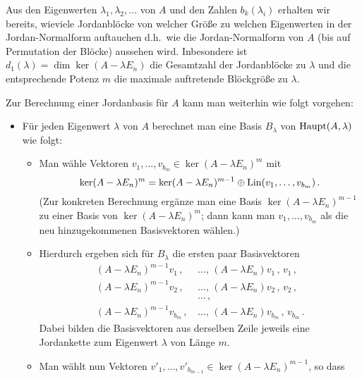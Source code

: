 \documentclass[a4paper,10pt,numbers = noenddot]{scrartcl}
\begin{document}
Aus den Eigenwerten $\lambda_1, \lambda_2, \dotsc$ von $A$ und den Zahlen $b_k(\lambda_i)$ erhalten wir bereits, wieviele Jordanblöcke von welcher Größe zu welchen Eigenwerten in der Jordan-Normalform auftauchen d.h.\ wie die Jordan-Normalform von $A$ (bis auf Permutation der Blöcke) aussehen wird.
Inbesondere ist $d_1(\lambda) = \dim \ker (A - \lambda E_n)$ die Gesamtzahl der Jordanblöcke zu $\lambda$ und die entsprechende Potenz $m$ die maximale auftretende Blöckgröße zu $\lambda$.

Zur Berechnung einer Jordanbasis für $A$ kann man weiterhin wie folgt vorgehen:

\begin{itemize}[resume]
  \item
    Für jeden Eigenwert $\lambda$ von $A$ berechnet man eine Basis $B_\lambda$ von $\operatorname{Haupt}(A, \lambda)$ wie folgt:
    \begin{itemize}
      \item
        Man wähle Vektoren $v_1, \dotsc, v_{b_m} \in \ker (A - \lambda E_n)^m$ mit
        \[
                    \ker (A - \lambda E_n)^m
          =         \ker (A - \lambda E_n)^{m-1}
            \oplus  \operatorname{Lin}(v_1, \dotsc, v_{b_m}) \,.
        \]
        (Zur konkreten Berechnung ergänze man eine Basis $\ker (A - \lambda E_n)^{m-1}$ zu einer Basis von $\ker (A - \lambda E_n)^m$; dann kann man $v_1, \dotsc, v_{b_m}$ als die neu hinzugekommenen Basisvektoren wählen.)
      \item
        Hierdurch ergeben sich für $B_\lambda$ die ersten paar Basisvektoren
        \begin{align*}
          (A - \lambda E_n)^{m-1} v_1\,,\,      &\dotsc,\,  (A - \lambda E_n) v_1\,,\,      v_1\,,      \\
          (A - \lambda E_n)^{m-1} v_2\,,\,      &\dotsc,\,  (A - \lambda E_n) v_2\,,\,      v_2\,,      \\
                                                &\dotsc\,,                                              \\
          (A - \lambda E_n)^{m-1} v_{b_m}\,,\,  &\dotsc,\,  (A - \lambda E_n) v_{b_m}\,,\,  v_{b_m}\,.
        \end{align*}
        Dabei bilden die Basisvektoren aus derselben Zeile jeweils eine Jordankette zum Eigenwert $\lambda$ von Länge $m$.
      \item
        Man wählt nun Vektoren $v'_1, \dotsc, v'_{b_{m-1}} \in \ker (A - \lambda E_n)^{m-1}$, so dass
        \begin{align*}

\end{align*}
\end{itemize}
\end{itemize}
\end{document}

